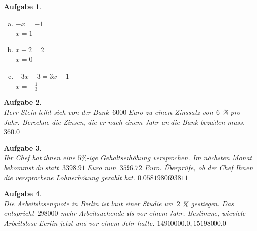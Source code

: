 \documentclass[12pt,fleqn]{article}
\theoremstyle{aufg}
\newtheorem{aufgabe}{Aufgabe}
\theoremstyle{bsp}
\begin{document}
\begin{flushleft}
\begin{aufgabe}
\begin{multicols}{3}
\begin{enumerate}[a)] 
\item 
$- x = -1$\\$x=1$
\item 
$x + 2 = 2$\\$x=0$
\item 
$- 3 x - 3 = 3 x - 1$\\$x=- \frac{1}{3}$
\end{enumerate} 
\end{multicols} 
\end{aufgabe} 
\begin{aufgabe} ~ \\ 
Herr Stein leiht sich von der Bank $\mathrm{\,6000}$ Euro zu einem Zinssatz von $\mathrm{\,6}$ \% pro Jahr. Berechne die Zinsen, die er nach einem Jahr an die Bank bezahlen muss.
$360.0$\end{aufgabe} 
\begin{aufgabe} ~ \\ 
Ihr Chef hat ihnen eine $5\%$-ige Gehaltserh\"ohung versprochen. Im n\"achsten Monat bekommst du statt $\mathrm{\,3398.91}$ Euro nun $\mathrm{\,3596.72}$ Euro. \"Uberpr\"ufe, ob der Chef Ihnen die versprochene Lohnerh\"ohung gezahlt hat. 
$0.0581980693811$\end{aufgabe} 
\begin{aufgabe} ~ \\ 
Die Arbeitslosenquote in Berlin ist laut einer Studie um $\mathrm{\,2}$ \% gestiegen. Das entspricht $\mathrm{\,298000}$ mehr Arbeitsuchende als vor einem Jahr. Bestimme, wieviele Arbeitslose Berlin jetzt und vor einem Jahr hatte.  
$14900000.0,15198000.0$\end{aufgabe} 
\end{flushleft} 
    
\end{document}
